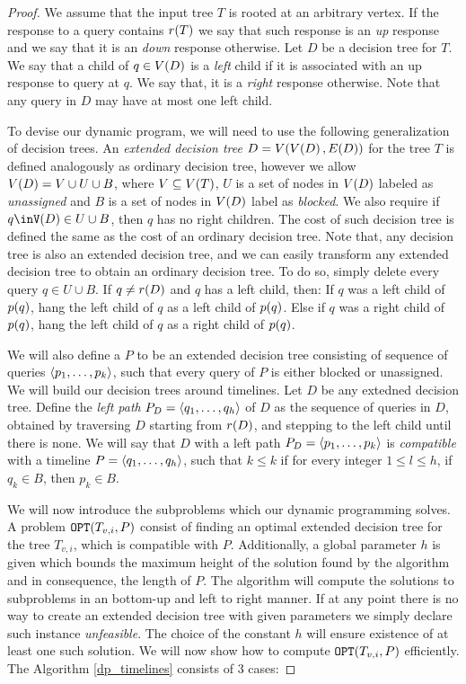 \begin{theorem}
\begin{proof}
We assume that the input tree $T$ is rooted at an arbitrary vertex. If the response to a query contains $r\mathopen{}\left( T \right)$ we say that such response is an \textit{up} response and we say that it is an \textit{down} response otherwise. Let $D$ be a decision tree for $T$. We say that a child of $q\in V\mathopen{}\left( D \right)$ is a \textit{left} child if it is associated with an up response to query at $q$. We say that, it is a \textit{right} response otherwise. Note that any query in $D$ may have at most one left child.

To devise our dynamic program, we will need to use the following generalization of decision trees. An \textit{extended decision tree} $D=V\mathopen{}\left( V\mathopen{}\left( D \right), E\mathopen{}\left( D \right) \right)$ for the tree $T$ is defined analogously as ordinary decision tree, however we allow $V\mathopen{}\left( D \right)=V\cup U \cup B$, where $V\subseteq V\mathopen{}\left( T \right)$, $U$ is a set of nodes in $V\mathopen{}\left( D \right)$ labeled as \textit{unassigned} and $B$ is a set of nodes in $V\mathopen{}\left( D \right)$ label as \textit{blocked}. We also require if $q\inV\br{D}\in U\cup B$, then $q$ has no right children. The cost of such decision tree is defined the same as the cost of an ordinary decision tree. Note that, any decision tree is also an extended decision tree, and we can easily transform any extended decision tree to obtain an ordinary decision tree. To do so, simply delete every query $q\in U\cup B$. If $q\neq r\mathopen{}\left( D \right)$ and $q$ has a left child, then: If $q$ was a left child of $p\mathopen{}\left( q \right)$, hang the left child of $q$ as a left child of $p\mathopen{}\left( q \right)$. Else if $q$ was a right child of $p\mathopen{}\left( q \right)$, hang the left child of $q$ as a right child of $p\mathopen{}\left( q \right)$.

We will also define a  $P$ to be an extended decision tree consisting of sequence of queries $\mathopen{}\langle p_1,\dots,p_k \rangle$, such that every query of $P$ is either blocked or unassigned. We will build our decision trees around timelines. Let $D$ be any extedned decision tree. Define the \textit{left path} $P_D=\mathopen{}\langle q_1,\dots,q_h \rangle$ of $D$ as the sequence of queries in $D$, obtained by traversing $D$ starting from $r\mathopen{}\left( D \right)$, and stepping to the left child until there is none. We will say that $D$ with a left path $P_D=\mathopen{}\langle p_1,\dots,p_k \rangle$ is \textit{compatible} with a timeline $P=\mathopen{}\langle q_1,\dots,q_h \rangle$, such that $k\leq k$ if for every integer $1\leq l \leq h$, if $q_k\in B$, then $p_k\in B$. 

We will now introduce the subproblems which our dynamic programming solves. A problem $\texttt{OPT}\mathopen{}\left( T_{v,i}, P \right)$ consist of finding an optimal extended decision tree for the tree $T_{v,i}$, which is compatible with $P$. Additionally, a global parameter $h$ is given which bounds the maximum height of the solution found by the algorithm and in consequence, the length of $P$. The algorithm will compute the solutions to subproblems in an bottom-up and left to right manner. If at any point there is no way to create an extended decision tree with given parameters we simply declare such instance \textit{unfeasible}. The choice of the constant $h$ will ensure existence of at least one such solution. We will now show how to compute $\texttt{OPT}\mathopen{}\left( T_{v,i}, P \right)$ efficiently. The Algorithm \ref{dp_timelines} consists of 3 cases:


\end{proof}
\end{theorem}
